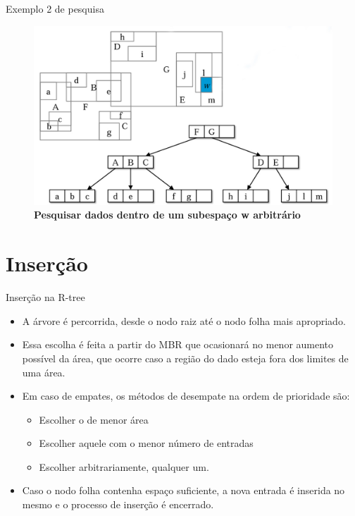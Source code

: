 \documentclass[compress,aspectratio=169]{beamer}
\begin{document}
\begin{frame}{Exemplo 2 de pesquisa}
\begin{figure}[] 
        \centering
        \includegraphics[width=0.73\linewidth]{pesquisa2.png}
        \caption{\textbf{Pesquisar dados dentro de um subespaço w arbitrário}}
        \label{fig:enter-label}  
\end{figure}
\end{frame}

\section{Inserção}

\begin{frame}{Inserção na R-tree}
    
    \begin{justify}
        \begin{itemize}
            \item A árvore é percorrida, desde o nodo raiz até o nodo folha mais apropriado.
            \item Essa escolha é feita a partir do MBR que ocasionará no menor aumento possível da área, que ocorre caso a região do dado esteja fora dos limites de uma área.
            \item Em caso de empates, os métodos de desempate na ordem de prioridade são:
                \begin{itemize}
                    \item Escolher o de menor área
                    \item Escolher aquele com o menor número de entradas
                    \item Escolher arbitrariamente, qualquer um.
                \end{itemize}
            \item Caso o nodo folha contenha espaço suficiente, a nova entrada é inserida no mesmo e o processo de inserção é encerrado.
        \end{itemize}
    
    \end{justify}
\end{frame}
\end{document}
